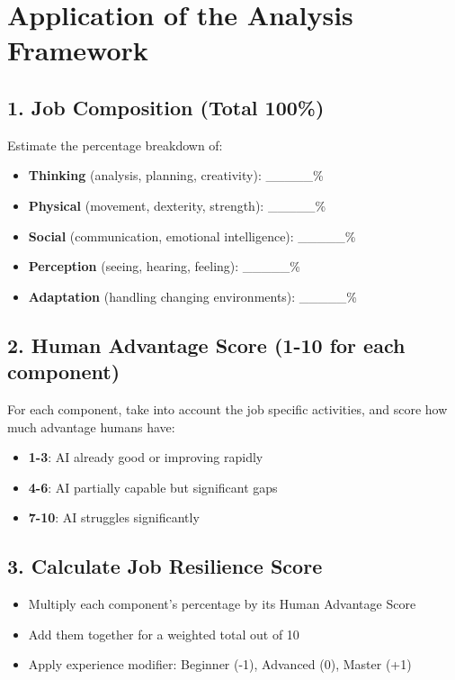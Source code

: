 \documentclass[
  11pt,
]{article}
\providecommand{\tightlist}{%
  \setlength{\itemsep}{0pt}\setlength{\parskip}{0pt}}
\begin{document}
\section{Application of the Analysis
Framework}\label{application-of-the-analysis-framework}

\subsection{1. Job Composition (Total
100\%)}\label{job-composition-total-100}

Estimate the percentage breakdown of:

\begin{itemize}
\tightlist
\item
  \textbf{Thinking} (analysis, planning, creativity): \_\_\_\_\_\%
\item
  \textbf{Physical} (movement, dexterity, strength): \_\_\_\_\_\%
\item
  \textbf{Social} (communication, emotional intelligence): \_\_\_\_\_\%
\item
  \textbf{Perception} (seeing, hearing, feeling): \_\_\_\_\_\%
\item
  \textbf{Adaptation} (handling changing environments): \_\_\_\_\_\%
\end{itemize}

\subsection{2. Human Advantage Score (1-10 for each
component)}\label{human-advantage-score-1-10-for-each-component}

For each component, take into account the job specific activities, and
score how much advantage humans have:

\begin{itemize}
\tightlist
\item
  \textbf{1-3}: AI already good or improving rapidly
\item
  \textbf{4-6}: AI partially capable but significant gaps
\item
  \textbf{7-10}: AI struggles significantly
\end{itemize}

\subsection{3. Calculate Job Resilience
Score}\label{calculate-job-resilience-score}

\begin{itemize}
\tightlist
\item
  Multiply each component's percentage by its Human Advantage Score
\item
  Add them together for a weighted total out of 10
\item
  Apply experience modifier: Beginner (-1), Advanced (0), Master (+1)
\end{itemize}
\end{document}
